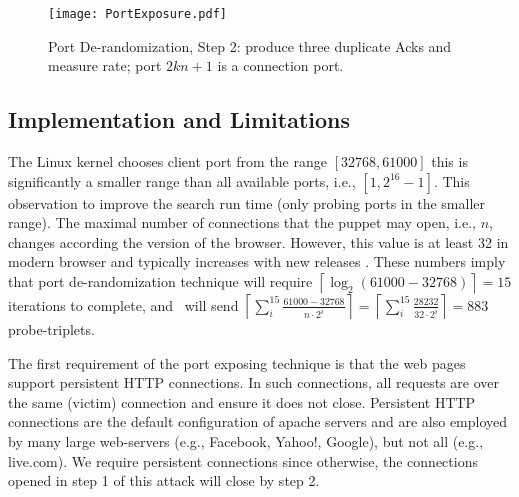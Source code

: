 \documentclass[conference]{IEEEtran}
\newcommand{\ignore}[1]{}
\begin{document}
\ignore{
Each iteration eliminates half the possible ports, after $\log_2(\textit{possible ports})$ the value $p$ is one of the ports that were allocated for the connection. This technique takes advantage on the algorithm sequential port allocation, allowing the adversary to only probe a fraction of the possible ports. Figure \ref{fig:portexposureiter} illustrates an iteration of the port exposure process.

The attacker can perform another $\log_2(n)$ iterations to identify the last allocated port and the current value of the port counter used for \lin. However, in the following phases of the TCP injection attack, we only require knowledge a client port used in a connection with \lin\ and not the exact counter value.
}

\begin{figure}
  \begin{center}
    \texttt{[image: PortExposure.pdf]}
  \end{center}
  \caption{Port De-randomization, Step 2: produce three duplicate Acks and measure rate; port $2kn + 1$ is a connection port.}
   \label{fig:portexposureiter}
\end{figure}


\subsection{Implementation and Limitations} \label{ports:values}

The Linux kernel chooses client port from the range $[32768, 61000]$ this is significantly a smaller range than all available ports, i.e., $[1,2^{16}-1]$. This observation to improve the search run time (only probing ports in the smaller range). The maximal number of connections that the puppet may open, i.e., $n$, changes according the version of the browser. However, this value is at least 32 in modern browser and typically increases with new releases \cite{browsers-stats}. These numbers imply that port de-randomization technique will require $\left\lceil  \log_2(61000 - 32768)\right\rceil = 15$ iterations to complete, and \mal\ will send $\left\lceil \sum_i^{15}\frac{61000 - 32768}{n\cdot2^i}\right\rceil = \left\lceil \sum_i^{15}\frac{28232}{32\cdot2^i}\right\rceil = 883$ probe-triplets.

The first requirement of the port exposing technique is that the web pages support persistent HTTP connections. In such connections, all requests are over the same (victim) connection and ensure it does not close. Persistent HTTP connections are the default configuration of apache servers and are also employed by many large web-servers (e.g., Facebook, Yahoo!, Google), but not all (e.g., live.com). We require persistent connections since otherwise, the connections opened in step 1 of this attack will close by step 2. 
\end{document}
